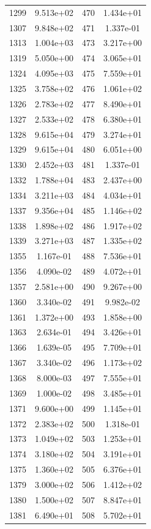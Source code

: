 \documentclass[12pt]{article}
\begin{document}
\begin{longtable}{@{}cccc@{}}
1299 & 9.513e+02 & 470 & 1.434e+01 \\
1307 & 9.848e+02 & 471 & 1.337e-01 \\
1313 & 1.004e+03 & 473 & 3.217e+00 \\
1319 & 5.050e+00 & 474 & 3.065e+01 \\
1324 & 4.095e+03 & 475 & 7.559e+01 \\
1325 & 3.758e+02 & 476 & 1.061e+02 \\
1326 & 2.783e+02 & 477 & 8.490e+01 \\
1327 & 2.533e+02 & 478 & 6.380e+01 \\
1328 & 9.615e+04 & 479 & 3.274e+01 \\
1329 & 9.615e+04 & 480 & 6.051e+00 \\
1330 & 2.452e+03 & 481 & 1.337e-01 \\
1332 & 1.788e+04 & 483 & 2.437e+00 \\
1334 & 3.211e+03 & 484 & 4.034e+01 \\
1337 & 9.356e+04 & 485 & 1.146e+02 \\
1338 & 1.898e+02 & 486 & 1.917e+02 \\
1339 & 3.271e+03 & 487 & 1.335e+02 \\
1355 & 1.167e-01 & 488 & 7.536e+01 \\
1356 & 4.090e-02 & 489 & 4.072e+01 \\
1357 & 2.581e+00 & 490 & 9.267e+00 \\
1360 & 3.340e-02 & 491 & 9.982e-02 \\
1361 & 1.372e+00 & 493 & 1.858e+00 \\
1363 & 2.634e-01 & 494 & 3.426e+01 \\
1366 & 1.639e-05 & 495 & 7.709e+01 \\
1367 & 3.340e-02 & 496 & 1.173e+02 \\
1368 & 8.000e-03 & 497 & 7.555e+01 \\
1369 & 1.000e-02 & 498 & 3.485e+01 \\
1371 & 9.600e+00 & 499 & 1.145e+01 \\
1372 & 2.383e+02 & 500 & 1.318e-01 \\
1373 & 1.049e+02 & 503 & 1.253e+01 \\
1374 & 3.180e+02 & 504 & 3.191e+01 \\
1375 & 1.360e+02 & 505 & 6.376e+01 \\
1379 & 3.000e+02 & 506 & 1.412e+02 \\
1380 & 1.500e+02 & 507 & 8.847e+01 \\
1381 & 6.490e+01 & 508 & 5.702e+01 \\

\end{longtable}
\end{document}
